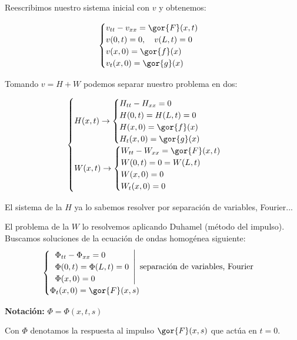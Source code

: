 			Reescribimos nuestro sistema inicial con $v$ y obtenemos:

			\[ \begin{cases}
				v_{tt} - v_{xx} = \gor{F}(x,t)\\
				v(0,t) = 0, \quad v(L,t) = 0 \\
				v(x,0) = \gor{f}(x) \\
				v_t(x,0) = \gor{g}(x)
			\end{cases}\]

		 	Tomando $v = H + W$ podemos separar nuestro problema en dos:

		 	\[ \begin{cases}
		 			H(x,t) \rightarrow
		 			\begin{cases}
				 		H_{tt} - H_{xx} = 0\\
				 		H(0,t) = H(L,t) = 0 \\
				 		H(x,0) = \gor{f}(x) \\
				 		H_t(x,0) = \gor{g}(x)
			 		\end{cases}\\
			 		W(x,t) \rightarrow
			 		\begin{cases}
				 		W_{tt} - W_{xx} = \gor{F}(x,t)\\
				 		W(0,t) = 0 = W(L,t) \\
				 		W(x,0) = 0 \\
				 		W_t(x,0) = 0
				 	\end{cases}
				 \end{cases}
			\]

			El sistema de la $H$ ya lo sabemos resolver por separación de variables, Fourier...

			El problema de la $W$ lo resolvemos aplicando Duhamel (método del impulso).
			Buscamos soluciones de la ecuación de ondas homogénea siguiente: 
			\[\begin{cases}
				\left.
				\begin{array}{l}
					\Phi_{tt} - \Phi_{xx} = 0 \\
					\Phi(0,t) = \Phi(L,t) = 0 \\
					\Phi(x,0) = 0 \\
				\end{array}
				\right| \text{ separación de variables, Fourier} \\
				\Phi_t(x,0) = \gor{F}(x,s)
			\end{cases}\]

			\textbf{Notación:} $ \Phi = \Phi(x,t,s)$

			Con $\Phi$ denotamos la respuesta al impulso $\gor{F}(x,s)$ que actúa en $t=0$.

